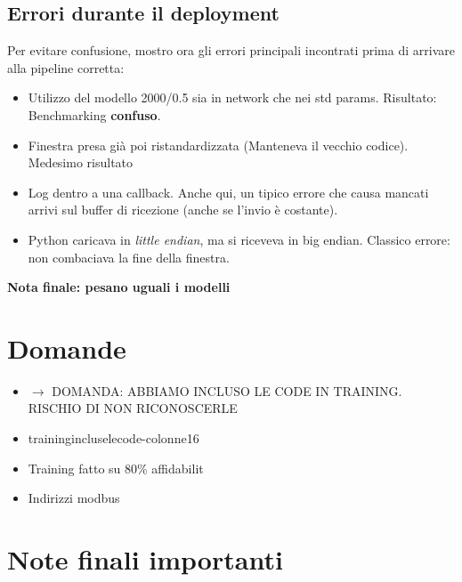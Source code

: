 \subsection{Errori durante il deployment}

Per evitare confusione, mostro ora gli errori principali incontrati prima di arrivare alla pipeline corretta:

\begin{itemize}
    \item Utilizzo del modello 2000/0.5 sia in network che nei std params. Risultato: Benchmarking \textbf{confuso}.
    \item Finestra presa già poi ristandardizzata (Manteneva il vecchio codice). Medesimo risultato
    \item Log dentro a una callback. Anche qui, un tipico errore che causa mancati arrivi sul buffer di ricezione (anche se l'invio è costante).
    \item Python caricava in \textit{little endian}, ma si riceveva in big endian. Classico errore: non combaciava la fine della finestra.
\end{itemize}
\begin{center}
    \textbf{Nota finale: pesano uguali i modelli}
\end{center}

\section{Domande}
\begin{itemize}
    \item[] $\rightarrow$ DOMANDA: ABBIAMO INCLUSO LE CODE IN TRAINING. RISCHIO DI NON RICONOSCERLE
    \item[] trainingincluselecode-colonne16
    \item Training fatto su 80\% affidabilit
    \item Indirizzi modbus
\end{itemize}


\section*{Note finali importanti}

